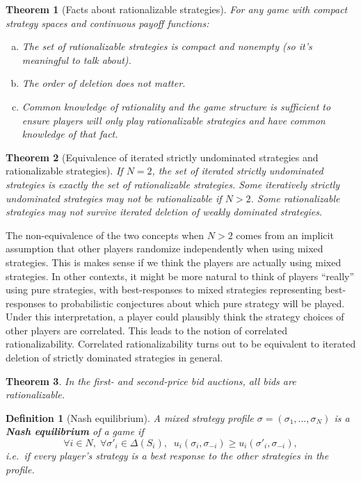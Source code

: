 \documentclass[letter, 11pt]{article}
\theoremstyle{basic}
\newtheorem{definition}{Definition}[section]
\newtheorem{theorem}{Theorem}[section]
\begin{document}
\begin{spacing}{1.0}
\begin{theorem}[Facts about rationalizable strategies]
  For any game with compact
  strategy spaces and continuous payoff functions:
  \begin{enumerate}[a)]\leftskip = 1em
  \item The set of rationalizable strategies is compact and
    nonempty (so it's meaningful to talk about).
  \item The order of deletion does not matter.
  \item Common knowledge of rationality and the game structure is
    sufficient to ensure players will only play rationalizable strategies
    and have common knowledge of that fact.
  \end{enumerate}
\end{theorem}

\begin{theorem}[Equivalence of iterated strictly undominated strategies and
  rationalizable strategies]
  If $N=2$, the set of iterated strictly
  undominated strategies is exactly the set of rationalizable
  strategies. Some iteratively strictly undominated strategies may not be
  rationalizable if $N>2$. Some rationalizable strategies may not survive
  iterated deletion of weakly dominated strategies.
\end{theorem}

The non-equivalence of the two concepts when $N>2$ comes from an implicit
assumption that other players randomize independently when using mixed
strategies. This is makes sense if we think the players are
actually using mixed strategies. In other contexts, it might be more
natural to think of players ``really'' using pure strategies, with best-responses to
mixed strategies representing best-responses to probabilistic conjectures
about which pure strategy will be played. Under this interpretation, a player could
plausibly think the strategy choices of other players are correlated. This
leads to the notion of correlated rationalizability. Correlated
rationalizability turns out to be equivalent to iterated deletion of
strictly dominated strategies in general.

\begin{theorem}
  In the first- and second-price bid auctions, all bids are rationalizable.
\end{theorem}

\begin{definition}[Nash equilibrium]
  A mixed strategy profile $\sigma = \left(\sigma_1,
    \ldots, \sigma_N\right)$ is a \textbf{Nash equilibrium} of a game
  if \[\forall i \in N,\; \forall \sigma'_i\in \Delta(S_i),\;\;
  u_i(\sigma_i, \sigma_{-i}) \geq u_i(\sigma'_i, \sigma_{-i}),\] i.e.~if
  every player's strategy is a best response to the other strategies in the
  profile.
\end{definition}


\end{spacing}
\end{document}
